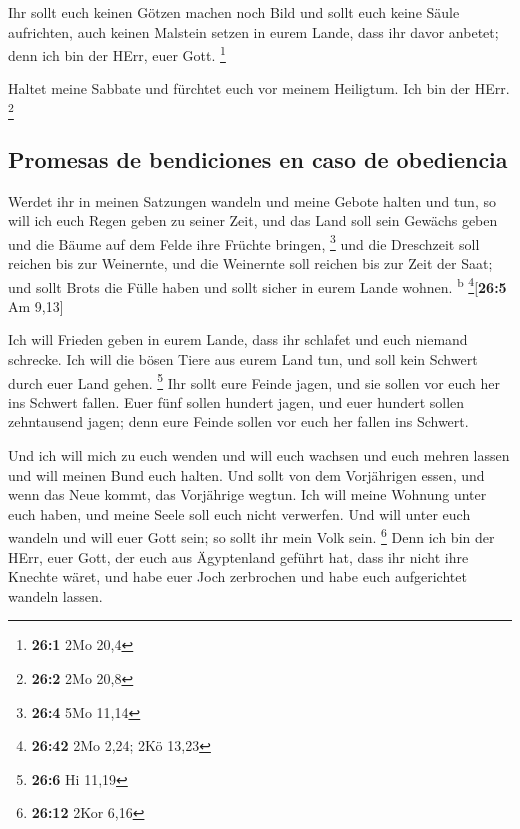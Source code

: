  Ihr sollt euch keinen Götzen machen noch Bild und sollt
euch keine Säule aufrichten, auch keinen Malstein setzen in eurem Lande,
dass ihr davor anbetet; denn ich bin der HErr, euer Gott. \footnote{\textbf{26:1}
  2Mo 20,4}

 Haltet meine Sabbate und fürchtet euch vor meinem
Heiligtum. Ich bin der HErr. \footnote{\textbf{26:2} 2Mo 20,8}

\hypertarget{promesas-de-bendiciones-en-caso-de-obediencia}{%
\subsection{Promesas de bendiciones en caso de
obediencia}\label{promesas-de-bendiciones-en-caso-de-obediencia}}

 Werdet ihr in meinen Satzungen wandeln und meine Gebote
halten und tun,  so will ich euch Regen geben zu seiner
Zeit, und das Land soll sein Gewächs geben und die Bäume auf dem Felde
ihre Früchte bringen, \footnote{\textbf{26:4} 5Mo 11,14} 
und die Dreschzeit soll reichen bis zur Weinernte, und die Weinernte
soll reichen bis zur Zeit der Saat; und sollt Brots die Fülle haben und
sollt sicher in eurem Lande wohnen. \textsuperscript{b}
\footnote{\textbf{26:42} 2Mo 2,24; 2Kö 13,23}{[}\textbf{26:5} Am 9,13{]}

 Ich will Frieden geben in eurem Lande, dass ihr schlafet
und euch niemand schrecke. Ich will die bösen Tiere aus eurem Land tun,
und soll kein Schwert durch euer Land gehen. \footnote{\textbf{26:6} Hi
  11,19}  Ihr sollt eure Feinde jagen, und sie sollen vor
euch her ins Schwert fallen.  Euer fünf sollen hundert
jagen, und euer hundert sollen zehntausend jagen; denn eure Feinde
sollen vor euch her fallen ins Schwert.

 Und ich will mich zu euch wenden und will euch wachsen
und euch mehren lassen und will meinen Bund euch halten. 
Und sollt von dem Vorjährigen essen, und wenn das Neue kommt, das
Vorjährige wegtun.  Ich will meine Wohnung unter euch
haben, und meine Seele soll euch nicht verwerfen.  Und
will unter euch wandeln und will euer Gott sein; so sollt ihr mein Volk
sein. \footnote{\textbf{26:12} 2Kor 6,16}  Denn ich bin
der HErr, euer Gott, der euch aus Ägyptenland geführt hat, dass ihr
nicht ihre Knechte wäret, und habe euer Joch zerbrochen und habe euch
aufgerichtet wandeln lassen.


